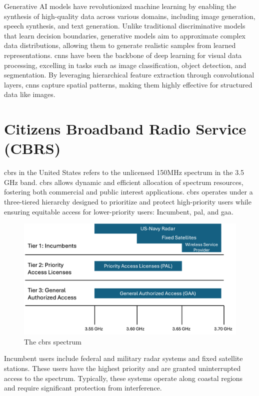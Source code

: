 Generative AI models have revolutionized machine learning by enabling the synthesis of high-quality data across various domains, including image generation, speech synthesis, and text generation. Unlike traditional discriminative models that learn decision boundaries, generative models aim to approximate complex data distributions, allowing them to generate realistic samples from learned representations. \gls{cnn}s have been the backbone of deep learning for visual data processing, excelling in tasks such as image classification, object detection, and segmentation. By leveraging hierarchical feature extraction through convolutional layers, \gls{cnn}s capture spatial patterns, making them highly effective for structured data like images.



\section{Citizens Broadband Radio Service (CBRS)}
\label{sec:sec-1-1}

\gls{cbrs} in the United States refers to the unlicensed 150MHz spectrum in the 3.5 GHz band. \gls{cbrs} allows dynamic and efficient allocation of spectrum resources, fostering both commercial and public interest applications. \gls{cbrs} operates under a three-tiered hierarchy designed to prioritize and protect high-priority users while ensuring equitable access for lower-priority users:
 Incumbent, \gls{pal}, and \gls{gaa}. 

\begin{figure}[ht]
\includegraphics[width=\textwidth]{figures/cbrs_1.png}
\centering
\caption{The \gls{cbrs} spectrum }
\label{fig:cbrs-spectrum}
\centering
\end{figure}


Incumbent users include federal and military radar systems and fixed satellite stations. These users have the highest priority and are granted uninterrupted access to the spectrum. Typically, these systems operate along coastal regions and require significant protection from interference.

